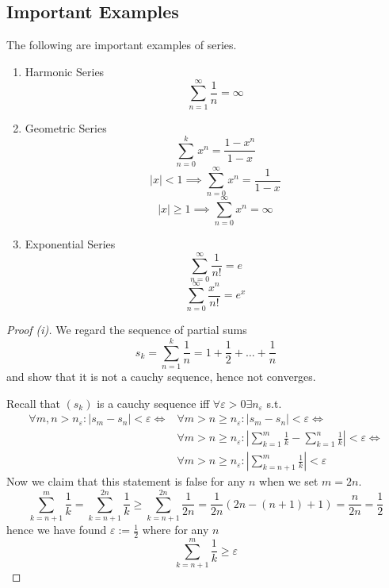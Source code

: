 \subsection{Important Examples}
\begin{proposition}
   The following are important examples of series.
   \begin{enumerate}[label=\roman*, align=Center]
      \item Harmonic Series
         \[\sum_{n = 1}^\infty \frac{1}{n} = \infty\]
      \item Geometric Series
         \[\sum_{n=0}^k x^n = \frac{1-x^n}{1-x}\]
         \[|x| < 1 \implies \sum_{n = 0}^\infty x^n = \frac{1}{1 - x}\]
         \[|x| \geq 1 \implies \sum_{n = 0}^\infty x^n = \infty\]
      \item Exponential Series
         \[\sum_{n=0}^\infty \frac{1}{n!} = e\]
         \[\sum_{n=0}^\infty \frac{x^n}{n!} = e^x\]
   \end{enumerate}
\end{proposition}
\begin{proof}[Proof (i)]
   We regard the sequence of partial sums
   \[s_k = \sum_{n = 1}^k \frac{1}{n} = 1 + \frac{1}{2} + \ldots + \frac{1}{n}\]
   and show that it is not a cauchy sequence, hence not converges.

   Recall that \((s_k)\) is a cauchy sequence iff \(\forall \varepsilon > 0 \exists n_\varepsilon\) s.t.
   \begin{equation*}
      \begin{split}
         \forall m, n > n_\varepsilon: |s_m - s_n| < \varepsilon \iff & \forall m > n \geq n_\varepsilon: |s_m - s_n| < \varepsilon \iff \\
                                                                      & \forall m > n \geq n_\varepsilon: \left|\sum_{k=1}^m \frac{1}{k} - \sum_{k = 1}^n \frac{1}{k}\right| < \varepsilon \iff \\
                                                                      & \forall m > n \geq n_\varepsilon: \left|\sum_{k=n+1}^m \frac{1}{k}\right| < \varepsilon
      \end{split}
   \end{equation*}
   Now we claim that this statement is false for any \(n\) when we set \(m = 2n\).
   \[\sum_{k=n+1}^{m} \frac{1}{k} = \sum_{k=n+1}^{2n} \frac{1}{k} \geq \sum_{k=n+1}^{2n} \frac{1}{2n} = \frac{1}{2n} (2n - (n+1) + 1) = \frac{n}{2n} = \frac{1}{2}\]
   hence we have found \(\varepsilon := \frac{1}{2}\) where for any \(n\)
   \[\sum_{k=n+1}^{m} \frac{1}{k} \geq \varepsilon\]
\end{proof}
